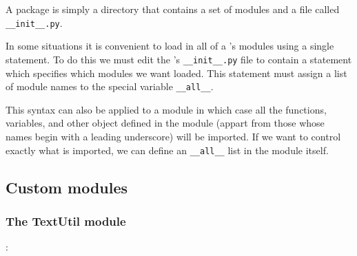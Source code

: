 A package is simply a directory that contains a set of modules and a file called \verb|__init__.py|.



In some situations it is convenient to load in all of a ’s modules using a single statement.
To do this we must edit the ’s \verb|__init__.py| file to contain a statement which specifies which modules we want loaded.
This statement must assign a list of module names to the special variable \verb|__all__|.



This syntax can also be applied to a module in which case all the functions, variables, and other object defined in the module (appart from those whose names begin with a leading underscore) will be imported.
If we want to control exactly what is imported, we can define an \verb|__all__| list in the module itself.




\subsection{Custom modules}

\subsubsection{The TextUtil module}



:

